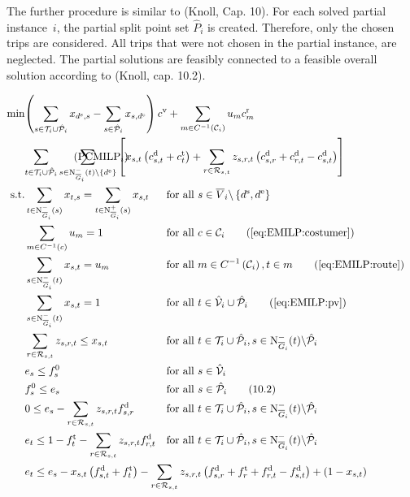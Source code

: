 The further procedure is similar to (Knoll, Cap. 10). For each solved partial instance~$i$, the partial split point set $\hat{P}_i$ is created. Therefore, only the chosen trips are considered. All trips that were not chosen in the partial instance, are neglected. The partial solutions are feasibly connected to a feasible overall solution according to (Knoll, cap. 10.2).

\begin{align}
\label{eq:PCMILP}
	\min & \omit\rlap{$\displaystyle{\left(\sum_{s\in\Ti\cup\Phat_i} x_{\ds,s} - \sum_{s\in\Phat_i} x_{s,\de}\right)\cv + \sum_{m\in C^{-1}\left(\mathcal{C}_i\right)} u_m \croute_m}$} \nonumber \\
	& \omit\rlap{$\displaystyle{\sum_{t\in\Ti\cup\Phat_i}\sum_{s\in\Ninoi(t)\backslash\left\{\de\right\}}\left[x_{s,t}\left(\cd_{s,t}+\ct_t\right)+\sum_{r\in\Rst}z_{s,r,t}\left(\cd_{s,r}+\cd_{r,t}-\cd_{s,t}\right)\right]}$} \tag{$\operatorname{PCMILP}_i$} \\
	\text{s.t.} & \sum_{t\in\Ninoi(s)} x_{t,s} = \sum_{t\in\Noutoi(s)} x_{s,t} & & \text{for all } s\in \overline{V}_i\backslash\left\{\ds,\de\right\} \\
	& \sum_{m\in C^{-1}(c)} u_m = 1 && \text{for all } c\in\mathcal{C}_i \tag{\ref{eq:EMILP:costumer}} \\
	& \sum_{s\in\Ninoi(t)} x_{s,t} = u_m && \text{for all } m\in C^{-1}\left(\mathcal{C}_i\right), t\in m \tag{\ref{eq:EMILP:route}} \\
	& \sum_{s\in\Ninoi(t)} x_{s,t} = 1 && \text{for all } t\in\Vhat_i\cup\Phat_i \tag{\ref{eq:EMILP:pv}} \\
	& \sum_{r\in\Rst} z_{s,r,t} \leq x_{s,t} & & \text{for all } t\in\Ti\cup\Phat_i, s\in\Ninoi(t)\backslash\Phat_i \\
	& e_s \leq f_s^0 & & \text{for all } s\in\Vhat_i \\
	& f^0_s \leq e_s && \text{for all } s\in\Phat_i \tag{10.2} \\
	& 0 \leq e_s - \sum_{r\in\Rst} z_{s,r,t}\fd_{s,r} & & \text{for all } t\in\Ti\cup\Phat_i, s\in\Ninoi(t)\backslash\Phat_i \\
	& e_t \leq 1 - \ft_t - \sum_{r\in\Rst} z_{s,r,t}\fd_{r,t} & & \text{for all } t\in\Ti\cup\Phat_i, s\in\Ninoi(t)\backslash\Phat_i \\
	& \omit\rlap{$\displaystyle{e_t \leq e_s - x_{s,t}\left(f_{s,t}^{\operatorname{d}}+f_t^{\operatorname{t}}\right) - \sum_{r\in\Rst} z_{s,r,t}\left(\fd_{s,r}+\ft_r+\fd_{r,t}-\fd_{s,t}\right) + \left(1-x_{s,t}\right)}$} \nonumber \\

\end{align}
